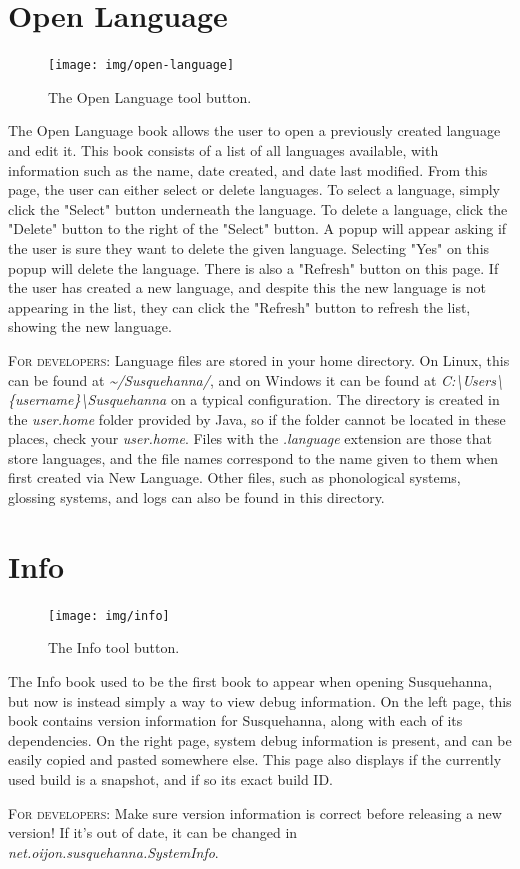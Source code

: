\documentclass{report}
\begin{document}
	\section{Open Language}
	\begin{figure}
		\centering
		\texttt{[image: img/open-language]}
		\caption{The Open Language tool button.}
		\label{fig:open-language}
	\end{figure}
	The Open Language book allows the user to open a previously created language and edit it. This book consists of a list of all languages available, with information such as the name, date created, and date last modified. From this page, the user can either select or delete languages. To select a language, simply click the "Select" button underneath the language. To delete a language, click the "Delete" button to the right of the "Select" button. A popup will appear asking if the user is sure they want to delete the given language. Selecting "Yes" on this popup will delete the language. There is also a "Refresh" button on this page. If the user has created a new language, and despite this the new language is not appearing in the list, they can click the "Refresh" button to refresh the list, showing the new language.
	\begin{tcolorbox}[width=1\textwidth]
		\textsc{For developers:} Language files are stored in your home directory. On Linux, this can be found at \emph{\textasciitilde/Susquehanna/}, and on Windows it can be found at \emph{C:{\textbackslash}Users{\textbackslash}\{username\}{\textbackslash}Susquehanna} on a typical configuration. The directory is created in the \emph{user.home} folder provided by Java, so if the folder cannot be located in these places, check your \emph{user.home}. Files with the \emph{.language} extension are those that store languages, and the file names correspond to the name given to them when first created via New Language. Other files, such as phonological systems, glossing systems, and logs can also be found in this directory.
	\end{tcolorbox}
	\section{Info}\label{sec:info}
	\begin{figure}
		\centering
		\texttt{[image: img/info]}
		\caption{The Info tool button.}
		\label{fig:info}
	\end{figure}
	The Info book used to be the first book to appear when opening Susquehanna, but now is instead simply a way to view debug information. On the left page, this book contains version information for Susquehanna, along with each of its dependencies. On the right page, system debug information is present, and can be easily copied and pasted somewhere else. This page also displays if the currently used build is a snapshot, and if so its exact build ID.
	\begin{tcolorbox}[width=1\textwidth]
		\textsc{For developers:} Make sure version information is correct before releasing a new version! If it's out of date, it can be changed in \emph{net.oijon.susquehanna.SystemInfo}.
	\end{tcolorbox}
\end{document}

